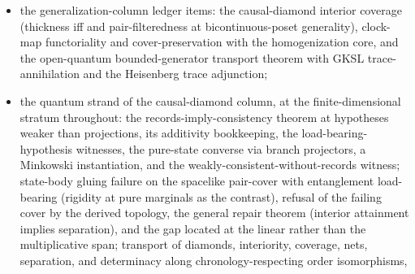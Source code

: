 \begin{itemize}
  the positive-homogeneity failure witness, the finite Legendre
  transform of threshold profiles, the exact intertwining square
  with its two cost-law countermodels and the once-drawn
  diagonal's strict gap, the mixed-contraction identity with the
  strict exchange witness, wing collapse at prevision
  equivalence, and the Hurwicz chord decomposition with the
  certificate-pair rule and the finite-chords strictness
  witness; the coherent
  lower-prevision package with the finite envelope theorem and the
  natural extension's universal property, LP duality, and sure-loss
  alternative, with its four-mutant battery; the composition law's
  containment in the least-committal glue, with the crisp-locus iff
  and the strict rational witness; the feasibility (properness)
  equivalence at both strata with the exact conditional-product
  witness and its agreement-clause mutant; the leak-aware
  safe-side bound for submass models, envelope form and precise
  recovery, with the total-leak counterexample; and the credal-body
  poset of Remark~\ref{rem:su-body-atlas} --- placements, strict
  edges, and incomparability witnesses across the atlas's classes,
  the convexity adjudication trio (sufficiency, non-necessity, the
  boundary-jump closedness failure), and the
  prevision--ultracontribution identification;
\item the generalization-column ledger items: the causal-diamond
  interior coverage (thickness iff and pair-filteredness at
  bicontinuous-poset generality), clock-map functoriality and
  cover-preservation with the homogenization core, and the
  open-quantum bounded-generator transport theorem with GKSL
  trace-annihilation and the Heisenberg trace adjunction;
\item the quantum strand of the causal-diamond column, at the
  finite-dimensional stratum throughout: the
  records-imply-consistency theorem at hypotheses weaker than
  projections, its additivity bookkeeping, the
  load-bearing-hypothesis witnesses, the pure-state converse via
  branch projectors, a Minkowski instantiation, and the
  weakly-consistent-without-records witness; state-body gluing
  failure on the spacelike pair-cover with entanglement
  load-bearing (rigidity at pure marginals as the contrast),
  refusal of the failing cover by the derived topology, the general
  repair theorem (interior attainment implies separation), and the
  gap located at the linear rather than the multiplicative span;
  transport of diamonds, interiority, coverage, nets, separation,
  and determinacy along chronology-respecting order isomorphisms,

\end{itemize}
